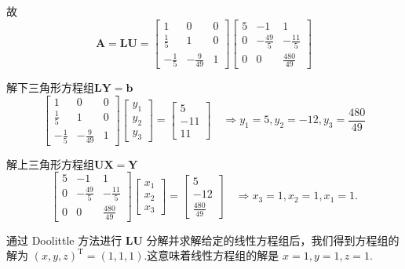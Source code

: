 \begin{tcolorbox}
故
$$
\boldsymbol{A}=\boldsymbol{L} \boldsymbol{U}= \left[\begin{array}{ccc}1 & 0 & 0 \\ \frac{1}{5} & 1 & 0 \\ -\frac{1}{5} & -\frac{9}{49} & 1\end{array}\right]\left[\begin{array}{ccc}5 & -1 & 1 \\ 0 & -\frac{49}{5} & -\frac{11}{5} \\ 0 & 0 & \frac{480}{49}\end{array}\right]
$$

解下三角形方程组$\boldsymbol{LY=b}$
$$
\left[\begin{array}{ccc}1 & 0 & 0 \\ \frac{1}{5} & 1 & 0 \\ -\frac{1}{5} & -\frac{9}{49} & 1\end{array}\right]\left[\begin{array}{l}
y_{1} \\
y_{2} \\
y_{3}
\end{array}\right]=\left[\begin{array}{l}
5 \\
-11 \\
11
\end{array}\right] \quad \Longrightarrow
y_{1}=5, y_{2}=-12, y_{3}=\dfrac{480}{49}
$$

解上三角形方程组$\boldsymbol{UX=Y}$
$$
\left[\begin{array}{ccc}5 & -1 & 1 \\ 0 & -\frac{49}{5} & -\frac{11}{5} \\ 0 & 0 & \frac{480}{49}\end{array}\right]\left[\begin{array}{l}
x_{1} \\
x_{2} \\
x_{3}
\end{array}\right]=\left[\begin{array}{c}
5 \\
-12 \\
\frac{480}{49}
\end{array}\right]\quad \Longrightarrow x_3=1, x_2=1, x_1=1.
$$

通过 Doolittle 方法进行 $\boldsymbol{LU}$ 分解并求解给定的线性方程组后，我们得到方程组的解为 $(x, y, z)^\mathrm{T} = (1, 1, 1)$.这意味着线性方程组的解是 $x=1, y=1, z=1$.
\end{tcolorbox}
